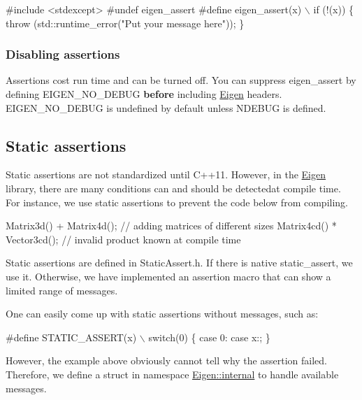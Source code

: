 \begin{DoxyCode}
\textcolor{preprocessor}{#include <stdexcept>}
\textcolor{preprocessor}{#undef eigen\_assert}
\textcolor{preprocessor}{#define eigen\_assert(x) \(\backslash\)}
\textcolor{preprocessor}{  if (!(x)) \{ throw (std::runtime\_error("Put your message here")); \}}
\end{DoxyCode}
\hypertarget{_topic_assertions_DisableAssert}{}\subsubsection{Disabling assertions}\label{_topic_assertions_DisableAssert}
Assertions cost run time and can be turned off. You can suppress eigen\+\_\+assert by defining {\ttfamily E\+I\+G\+E\+N\+\_\+\+N\+O\+\_\+\+D\+E\+B\+UG} {\bfseries before} including \hyperlink{namespace_eigen}{Eigen} headers. {\ttfamily E\+I\+G\+E\+N\+\_\+\+N\+O\+\_\+\+D\+E\+B\+UG} is undefined by default unless {\ttfamily N\+D\+E\+B\+UG} is defined.\hypertarget{_topic_assertions_StaticAssert}{}\subsection{Static assertions}\label{_topic_assertions_StaticAssert}
Static assertions are not standardized until C++11. However, in the \hyperlink{namespace_eigen}{Eigen} library, there are many conditions can and should be detectedat compile time. For instance, we use static assertions to prevent the code below from compiling.


\begin{DoxyCode}
Matrix3d()  + Matrix4d();   \textcolor{comment}{// adding matrices of different sizes}
Matrix4cd() * Vector3cd();  \textcolor{comment}{// invalid product known at compile time}
\end{DoxyCode}


Static assertions are defined in Static\+Assert.\+h. If there is native static\+\_\+assert, we use it. Otherwise, we have implemented an assertion macro that can show a limited range of messages.

One can easily come up with static assertions without messages, such as\+:


\begin{DoxyCode}
\textcolor{preprocessor}{#define STATIC\_ASSERT(x) \(\backslash\)}
\textcolor{preprocessor}{  switch(0) \{ case 0: case x:; \}}
\end{DoxyCode}


However, the example above obviously cannot tell why the assertion failed. Therefore, we define a {\ttfamily struct} in namespace \hyperlink{namespace_eigen_1_1internal}{Eigen\+::internal} to handle available messages.


